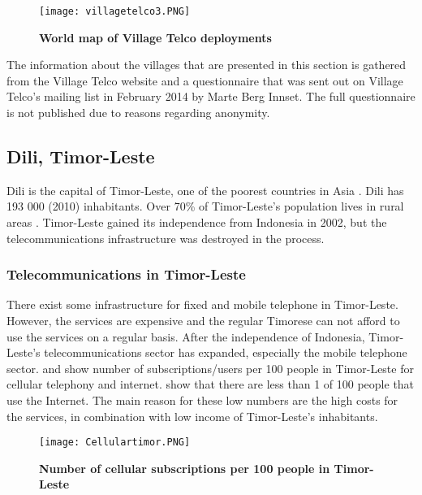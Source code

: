 \begin{figure}[H]
\centering
\texttt{[image: villagetelco3.PNG]}
\caption [World map of Village Telco deployments]{\textbf{World map of Village Telco deployments}}
\label{fig:mapdeployments}
\end{figure}

The information about the villages that are presented in this section is gathered from the Village Telco website \cite{villagetelcodeployments} and a questionnaire that was sent out on Village Telco's mailing list in February 2014 by Marte Berg Innset. The full questionnaire is not published due to reasons regarding anonymity. 

\subsection{Dili, Timor-Leste}\label{sec:timor}
Dili is the capital of Timor-Leste, one of the poorest countries in Asia \cite{vtdili}. Dili has 193 000 (2010) inhabitants. Over 70\% of Timor-Leste's population lives in rural areas \cite{quandltimor}.  Timor-Leste gained its independence from Indonesia in 2002, but the telecommunications infrastructure was destroyed in the process. 


\subsubsection{Telecommunications in Timor-Leste}
There exist some infrastructure for fixed and mobile telephone in Timor-Leste. However, the services are expensive and the regular Timorese can not afford to use the services on a regular basis. After the independence of Indonesia, Timor-Leste's telecommunications sector has expanded, especially the mobile telephone sector.  and  show number of subscriptions/users per 100 people in Timor-Leste for cellular telephony and internet.  show that there are less than 1 of 100 people that use the Internet. The main reason for these low numbers are the high costs for the services, in combination with low income of Timor-Leste's inhabitants. 


\begin{figure}[H]
\centering
\texttt{[image: Cellulartimor.PNG]}
\caption[Number of cellular subscriptions per 100 people in Timor-Leste]{\textbf{Number of cellular subscriptions per 100 people in Timor-Leste}}
\label{fig:cellulartimor}
\end{figure}


